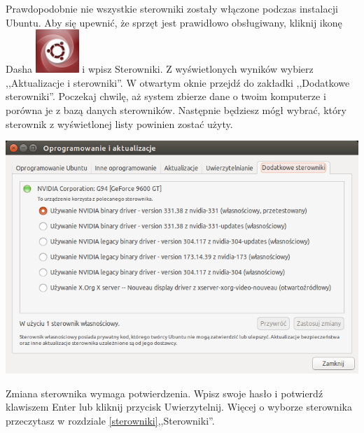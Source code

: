Prawdopodobnie nie wszystkie sterowniki zostały włączone podczas instalacji Ubuntu. Aby się upewnić, że sprzęt jest prawidłowo obsługiwany, kliknij ikonę Dasha \includegraphics[scale=0.35]{images/ikony_dash.png} i wpisz \textcolor{ubuntu_orange}{Sterowniki}. Z wyświetlonych wyników wybierz ,,Aktualizacje i sterowniki''. W otwartym oknie przejdź do zakładki ,,Dodatkowe sterowniki''. Poczekaj chwilę, aż system zbierze dane o twoim komputerze i porówna je z bazą danych sterowników. Następnie będziesz mógł wybrać, który sterownik z wyświetlonej listy powinien zostać użyty.
\begin{center}
	\vspace{-10pt}
	\includegraphics[width=\linewidth]{images/pierwsze_uruchomienie_driver2.png}
\end{center}

Zmiana sterownika wymaga potwierdzenia. Wpisz swoje hasło i potwierdź klawiszem Enter lub kliknij przycisk \textcolor{ubuntu_orange}{Uwierzytelnij}. Więcej o wyborze sterownika przeczytasz w rozdziale \ref{sterowniki},,Sterowniki''.

